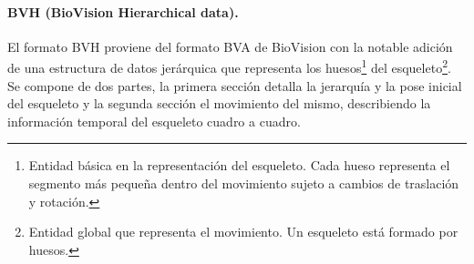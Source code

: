 \paragraph{BVH (BioVision Hierarchical data).}

El formato BVH proviene del formato BVA de BioVision con la notable adición de una estructura de datos jerárquica que representa los huesos\footnote{Entidad básica en la representación del esqueleto. Cada hueso representa el segmento más pequeña dentro del movimiento sujeto a cambios de traslación y rotación. } del esqueleto\footnote{Entidad global que representa el movimiento. Un esqueleto está formado por huesos.}. Se compone de dos partes, la primera sección detalla la jerarquía y la pose inicial del esqueleto y la segunda sección el movimiento del mismo, describiendo la información temporal del esqueleto cuadro a cuadro.
 
